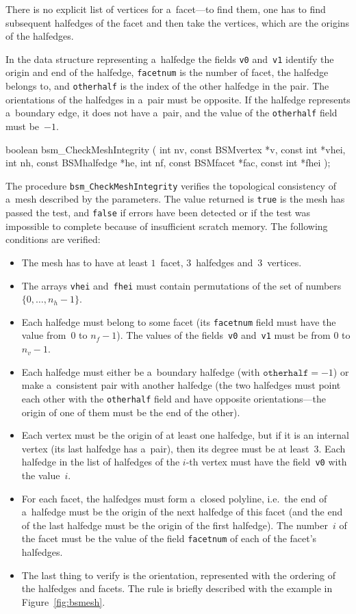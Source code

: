 There is no explicit list of vertices for a~facet---to find them, one has
to find subsequent halfedges of the facet and then take the vertices, which
are the origins of the halfedges.

In the data structure representing a~halfedge the fields \texttt{v0}
and~\texttt{v1} identify the origin and end of the halfedge,
\texttt{facetnum} is the number of facet, the halfedge belongs to, and
\texttt{otherhalf} is the index of the other halfedge in the pair. The
orientations of the halfedges in a~pair must be opposite. If the halfedge
represents a~boundary edge, it does not have a~pair, and the value of the
\texttt{otherhalf} field must be~$-1$.

\newpage
\begin{listingC}
boolean bsm_CheckMeshIntegrity (
             int nv, const BSMvertex *v, const int *vhei,
             int nh, const BSMhalfedge *he,
             int nf, const BSMfacet *fac, const int *fhei );
\end{listingC}

The procedure \texttt{bsm\_CheckMeshIntegrity} verifies the topological
consistency of a~mesh described by the parameters. The value returned is
\texttt{true} is the mesh has passed the test, and \texttt{false} if errors
have been detected or if the test was impossible to complete because of
insufficient scratch memory. The following conditions are verified:
\begin{itemize}
\item The mesh has to have at least $1$~facet, $3$~halfedges
and~$3$~vertices.
\item The arrays \texttt{vhei} and~\texttt{fhei} must contain permutations
of the set of numbers $\{0,\ldots,n_h-1\}$.
\item Each halfedge must belong to some facet (its \texttt{facetnum} field must
have the value from~$0$ to $n_f-1$). The values of the fields~\texttt{v0}
and~\texttt{v1} must be from $0$ to $n_v-1$.
\item Each halfedge must either be a~boundary halfedge (with
$\texttt{otherhalf}=-1$) or make a~consistent pair with another halfedge
(the two halfedges must point each other with the \texttt{otherhalf} field
and have opposite orientations---the origin of one of them must be the end
of the other).
\item Each vertex must be the origin of at least one halfedge, but if it is
an internal vertex (its last halfedge has a~pair), then its degree must be
at least~$3$. Each halfedge in the list of halfedges of the $i$-th vertex
must have the field~\texttt{v0} with the value~$i$.
\item For each facet, the halfedges must form a~closed polyline, i.e.\ the
end of a~halfedge must be the origin of the next halfedge of this facet (and
the end of the last halfedge must be the origin of the first halfedge).
The number~$i$ of the facet must be the value of the field \texttt{facetnum}
of each of the facet's halfedges.
\item The last thing to verify is the orientation, represented with the
ordering of the halfedges and facets. The rule is briefly described with the
example in Figure~\ref{fig:bsmesh}.
\end{itemize}

